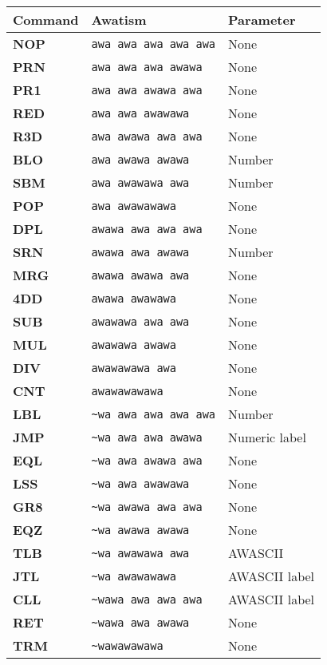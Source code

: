 \documentclass[11pt,a4paper,draft]{book}
\begin{document}
\begin{longtable}{lll}
  \toprule
  Command & Awatism & Parameter \\
  \midrule \endhead

  \bottomrule \endfoot

  \textbf{NOP} & \verb|awa awa awa awa awa| & None \\
  \textbf{PRN} & \verb|awa awa awa awawa| & None \\
  \textbf{PR1} & \verb|awa awa awawa awa| & None \\
  \textbf{RED} & \verb|awa awa awawawa| & None \\
  \textbf{R3D} & \verb|awa awawa awa awa| & None \\
  \textbf{BLO} & \verb|awa awawa awawa| & Number \\
  \textbf{SBM} & \verb|awa awawawa awa| & Number \\
  \textbf{POP} & \verb|awa awawawawa| & None \\
  \textbf{DPL} & \verb|awawa awa awa awa| & None \\
  \textbf{SRN} & \verb|awawa awa awawa| & Number \\
  \textbf{MRG} & \verb|awawa awawa awa| & None \\
  \textbf{4DD} & \verb|awawa awawawa| & None \\
  \textbf{SUB} & \verb|awawawa awa awa| & None \\
  \textbf{MUL} & \verb|awawawa awawa| & None \\
  \textbf{DIV} & \verb|awawawawa awa| & None \\
  \textbf{CNT} & \verb|awawawawawa| & None \\
  \textbf{LBL} & \verb|~wa awa awa awa awa| & Number \\
  \textbf{JMP} & \verb|~wa awa awa awawa| & Numeric label \\
  \textbf{EQL} & \verb|~wa awa awawa awa| & None \\
  \textbf{LSS} & \verb|~wa awa awawawa| & None \\
  \textbf{GR8} & \verb|~wa awawa awa awa| & None \\
  \textbf{EQZ} & \verb|~wa awawa awawa| & None \\
  \textbf{TLB} & \verb|~wa awawawa awa| & AWASCII \\
  \textbf{JTL} & \verb|~wa awawawawa| & AWASCII label \\
  \textbf{CLL} & \verb|~wawa awa awa awa| & AWASCII label \\
  \textbf{RET} & \verb|~wawa awa awawa| & None \\
  \textbf{TRM} & \verb|~wawawawawa| & None \\
\end{longtable}
\end{document}
